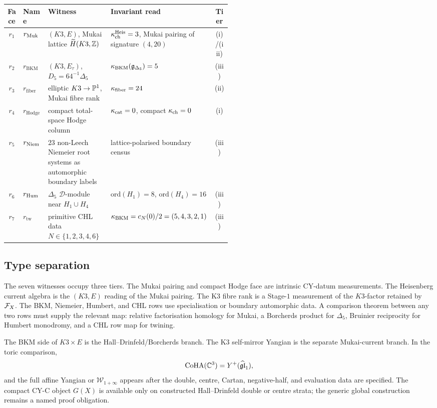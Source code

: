 \begin{center}
\small
\renewcommand{\arraystretch}{1.28}
\begin{tabular}{|c|l|p{0.29\linewidth}|p{0.23\linewidth}|c|}
\hline
Face & Name & Witness & Invariant read & Tier \\
\hline
\(r_1\) & \(r_{\mathrm{Muk}}\) &
\((K3,E)\), Mukai lattice \(\widetilde H(K3,\mathbb{Z})\) &
\(\kappa_{\mathrm{ch}}^{\mathrm{Heis}}=3\), Mukai pairing of signature \((4,20)\) & (i)/(iii) \\
\hline
\(r_2\) & \(r_{\mathrm{BKM}}\) &
\((K3,E_\tau)\), \(D_5=64^{-1}\Delta_5\) &
\(\kappa_{\mathrm{BKM}}(\mathfrak{g}_{\Delta_5})=5\) & (iii) \\
\hline
\(r_3\) & \(r_{\mathrm{fiber}}\) &
elliptic \(K3\to\mathbb{P}^1\), Mukai fibre rank &
\(\kappa_{\mathrm{fiber}}=24\) & (ii) \\
\hline
\(r_4\) & \(r_{\mathrm{Hodge}}\) &
compact total-space Hodge column &
\(\kappa_{\mathrm{cat}}=0\), compact \(\kappa_{\mathrm{ch}}=0\) & (i) \\
\hline
\(r_5\) & \(r_{\mathrm{Niem}}\) &
\(23\) non-Leech Niemeier root systems as automorphic boundary labels &
lattice-polarised boundary census & (iii) \\
\hline
\(r_6\) & \(r_{\mathrm{Hum}}\) &
\(\Delta_5\) \(\mathcal D\)-module near \(H_1\cup H_4\) &
\(\mathrm{ord}(H_1)=8\), \(\mathrm{ord}(H_4)=16\) & (iii) \\
\hline
\(r_7\) & \(r_{\mathrm{tw}}\) &
primitive CHL data \(N\in\{1,2,3,4,6\}\) &
\(\kappa_{\mathrm{BKM}}=c_N(0)/2=(5,4,3,2,1)\) & (iii) \\
\hline
\end{tabular}
\end{center}

\subsection{Type separation}
\label{wn:subsec:consequence-enumerate}

The seven witnesses occupy three tiers.  The Mukai pairing and compact
Hodge face are intrinsic CY-datum measurements.  The Heisenberg current
algebra is the \((K3,E)\) reading of the Mukai pairing.  The K3 fibre
rank is a Stage-\(1\) measurement of the \(K3\)-factor retained by
\(\mathcal{F}_X\).  The BKM, Niemeier, Humbert, and CHL rows use specialisation
or boundary automorphic data.  A comparison theorem between any two rows
must supply the relevant map: relative factorisation homology for Mukai,
a Borcherds product for \(\Delta_5\), Bruinier reciprocity for Humbert
monodromy, and a CHL row map for twining.

The BKM side of \(K3\times E\) is the Hall--Drinfeld/Borcherds branch.
The K3 self-mirror Yangian is the separate Mukai-current branch.  In the
toric comparison,
\[
  \mathrm{CoHA}(\mathbb{C}^3)=Y^+(\widehat{\mathfrak{gl}}_1),
\]
and the full affine Yangian or \(\mathcal W_{1+\infty}\) appears after
the double, centre, Cartan, negative-half, and evaluation data are
specified.  The compact CY-C object \(G(X)\) is available only on
constructed Hall--Drinfeld double or centre strata; the generic global
construction remains a named proof obligation.
